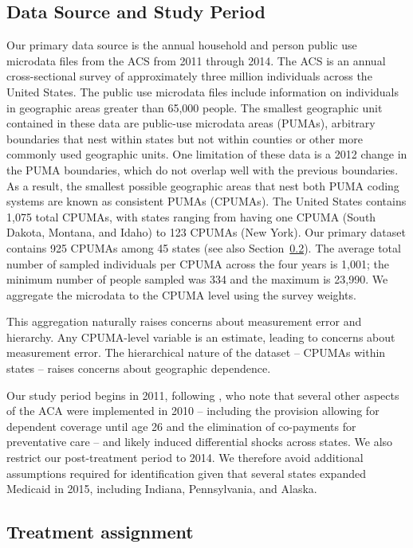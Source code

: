 \documentclass[aoas]{imsart}
\theoremstyle{plain}
\theoremstyle{remark}
\begin{document}
\subsection{Data Source and Study Period}\label{ssec:data}

Our primary data source is the annual household and person public use microdata files from the ACS from 2011 through 2014. The ACS is an annual cross-sectional survey of approximately three million individuals across the United States. The public use microdata files include information on individuals in geographic areas greater than 65,000 people. The smallest geographic unit contained in these data are public-use microdata areas (PUMAs), arbitrary boundaries that nest within states but not within counties or other more commonly used geographic units. One limitation of these data is a 2012 change in the PUMA boundaries, which do not overlap well with the previous boundaries. As a result, the smallest possible geographic areas that nest both PUMA coding systems are known as consistent PUMAs (CPUMAs). The United States contains 1,075 total CPUMAs, with states ranging from having one CPUMA (South Dakota, Montana, and Idaho) to 123 CPUMAs (New York). Our primary dataset contains 925 CPUMAs among 45 states (see also Section~\ref{sssec:txassign}). The average total number of sampled individuals per CPUMA across the four years is 1,001; the minimum number of people sampled was 334 and the maximum is 23,990. We aggregate the microdata to the CPUMA level using the survey weights.  

This aggregation naturally raises concerns about measurement error and hierarchy. Any CPUMA-level variable is an estimate, leading to concerns about measurement error. The hierarchical nature of the dataset -- CPUMAs within states -- raises concerns about geographic dependence.

Our study period begins in 2011, following \cite{courtemanche2017early}, who note that several other aspects of the ACA were implemented in 2010 -- including the provision allowing for dependent coverage until age 26 and the elimination of co-payments for preventative care -- and likely induced differential shocks across states. We also restrict our post-treatment period to 2014. We therefore avoid additional assumptions required for identification given that several states expanded Medicaid in 2015, including Indiana, Pennsylvania, and Alaska.

\subsection{Treatment assignment} \label{sssec:txassign}
\end{document}
